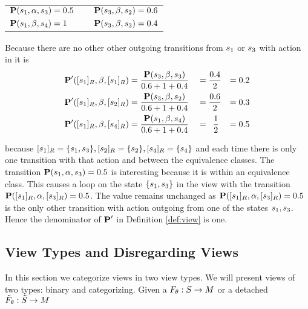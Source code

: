 \documentclass[preview]{standalone}
\begin{document}
\begin{exmp}
\begin{center}
	\begin{tabular}{lcl}
 ${{\textbf{P}}}({s}_1,{\alpha},{s}_3) = 0.5$& \quad\quad &	${{\textbf{P}}}({s}_3,{\beta},{s}_2) = 0.6$ \\
 ${{\textbf{P}}}({s}_1,{\beta},{s}_4) = 1$ & \quad\quad &	${{\textbf{P}}}({s}_3,{\beta},{s}_3) = 0.4$ \\
	\end{tabular}
\end{center}

Because there are no other other outgoing transitions from ${s}_1$ or ${s}_3$ with action \actionb in \view it is 
\begin{alignat*}{4}
	{\ensuremath{{\textbf{P}}}}'({{[{s}_1]_{{R}}}}, {\beta}, {{[{s}_1]_{{R}}}}) &= \frac{{{\textbf{P}}}({s}_3,{\beta},{s}_3)}{0.6+1+0.4} &&= \frac{0.4}{2} &= 0.2\\
	{{\textbf{P}}}'({{[{s}_1]_{{R}}}}, {\beta}, {{[{s}_2]_{{R}}}}) &= \frac{{{\textbf{P}}}({s}_3,{\beta},{s}_2)}{0.6+1+0.4} &&= \frac{0.6}{2} &= 0.3\\
	{{\textbf{P}}}'({{[{s}_1]_{{R}}}}, {\beta}, {{[{s}_4]_{{R}}}}) &= \frac{{{\textbf{P}}}({s}_1,{\beta},{s}_4)}{0.6+1+0.4} &&= \;\:\frac{1}{2} &= 0.5
\end{alignat*}

because ${{[{s}_1]_{{R}}}} = \{{s}_1, {s}_3\}, {{[{s}_2]_{{R}}}} = \{{s}_2\}, {{[{s}_4]_{{R}}}} = \{{s}_4\}$ and each time there is only one transition with that action and   between the equivalence classes. The transition ${{\textbf{P}}}({s}_1,{\alpha},{s}_3) = 0.5$ is interesting because it is within an equivalence class. This causes a loop on the state $\{{s}_1,{s}_3\}$ in the view \view with the transition ${{\textbf{P}}}({{[{s}_1]_{{R}}}},{\alpha},{{[{s}_3]_{{R}}}}) = 0.5$. The value remains unchanged as ${{\textbf{P}}}({{[{s}_1]_{{R}}}},{\alpha},{{[{s}_3]_{{R}}}}) = 0.5$ is the only other transition with action \action outgoing from one of the states ${s}_1,{s}_3$. Hence the denominator of ${{\textbf{P}}}'$ in Definition \ref{def:view} is one.
\end{exmp}

\subsection{View Types and Disregarding Views}
In this section we categorize views in two view types. We will present views of two types: binary and categorizing. Given a \grpfctN ${F_{{\theta}}} : {S} \to {\ensuremath{{M}}}$ or a detached \grpfctN ${\tilde{F}_{{\theta}}} : {\tilde{{S}}} \to {\ensuremath{{M}}}$
\end{document}
